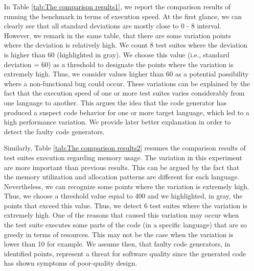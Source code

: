 In Table \ref{tab:The comparison results1}, we report the comparison results of running the benchmark in terms of execution speed. At the first glance, we can clearly see that all standard deviations are mostly close to 0 - 8 interval. However, we remark in the same table, that there are some variation points where the deviation is relatively high. We count 8 test suites where the deviation is higher than 60 (highlighted in gray). We choose this value (i.e., standard deviation = 60) as a threshold to designate the points where the variation is extremely high. Thus, we consider values higher than 60 as a potential possibility where a non-functional bug could occur. These variations can be explained by the fact that the execution speed of one or more test suites varies considerably from one language to another. This argues the idea that the code generator has produced a suspect code behavior for one or more target language, which led to a high performance variation. We provide later better explanation in order to detect the faulty code generators.

Similarly, Table \ref{tab:The comparison results2} resumes the comparison results of test suites execution regarding memory usage. The variation in this experiment are more important than previous results. This can be argued by the fact that the memory utilization and allocation patterns are different for each language. Nevertheless, we can recognize some points where the variation is extremely high. Thus, we choose a threshold value equal to 400 and we highlighted, in gray, the points that exceed this value. Thus, we detect 6 test suites where the variation is extremely high. 
One of the reasons that caused this variation may occur when the test suite executes some parts of the code (in a specific language) that are so greedy in terms of resources. This may not be the case when the variation is lower than 10 for example.
We assume then, that faulty code generators, in identified points, represent a threat for software quality since the generated code has shown symptoms of poor-quality design.


